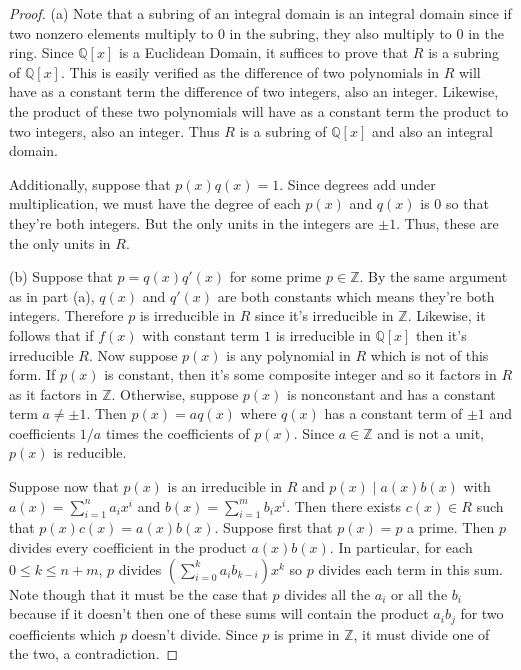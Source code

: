 \documentclass{article}
\begin{document}
\begin{proof}
(a) Note that a subring of an integral domain is an integral domain since if two nonzero elements multiply to $0$ in the subring, they also multiply to $0$ in the ring. Since $\mathbb{Q}[x]$ is a Euclidean Domain, it suffices to prove that $R$ is a subring of $\mathbb{Q}[x]$. This is easily verified as the difference of two polynomials in $R$ will have as a constant term the difference of two integers, also an integer. Likewise, the product of these two polynomials will have as a constant term the product to two integers, also an integer. Thus $R$ is a subring of $\mathbb{Q}[x]$ and also an integral domain.

Additionally, suppose that $p(x)q(x) = 1$. Since degrees add under multiplication, we must have the degree of each $p(x)$ and $q(x)$ is $0$ so that they're both integers. But the only units in the integers are $\pm 1$. Thus, these are the only units in $R$.

(b) Suppose that $p = q(x)q'(x)$ for some prime $p \in \mathbb{Z}$. By the same argument as in part (a), $q(x)$ and $q'(x)$ are both constants which means they're both integers. Therefore $p$ is irreducible in $R$ since it's irreducible in $\mathbb{Z}$. Likewise, it follows that if $f(x)$ with constant term $1$ is irreducible in $\mathbb{Q}[x]$ then it's irreducible $R$. Now suppose $p(x)$ is any polynomial in $R$ which is not of this form. If $p(x)$ is constant, then it's some composite integer and so it factors in $R$ as it factors in $\mathbb{Z}$. Otherwise, suppose $p(x)$ is nonconstant and has a constant term $a \neq \pm 1$. Then $p(x) = aq(x)$ where $q(x)$ has a constant term of $\pm 1$ and coefficients $1/a$ times the coefficients of $p(x)$. Since $a \in \mathbb{Z}$ and is not a unit, $p(x)$ is reducible.

Suppose now that $p(x)$ is an irreducible in $R$ and $p(x) \mid a(x)b(x)$ with $a(x) = \sum_{i=1}^n a_ix^i$ and $b(x) = \sum_{i=1}^m b_ix^i$. Then there exists $c(x) \in R$ such that $p(x)c(x) = a(x)b(x)$. Suppose first that $p(x) = p$ a prime. Then $p$ divides every coefficient in the product $a(x)b(x)$. In particular, for each $0 \leq k \leq n+m$, $p$ divides $\left ( \sum_{i=0}^k a_ib_{k-i} \right ) x^k$ so $p$ divides each term in this sum. Note though that it must be the case that $p$ divides all the $a_i$ or all the $b_i$ because if it doesn't then one of these sums will contain the product $a_ib_j$ for two coefficients which $p$ doesn't divide. Since $p$ is prime in $\mathbb{Z}$, it must divide one of the two, a contradiction.


\end{proof}
\end{document}
